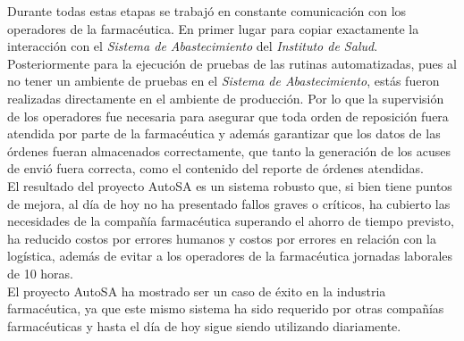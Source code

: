 Durante todas estas etapas se trabajó en constante comunicación con los operadores de la farmacéutica. En primer lugar para copiar exactamente la interacción con el \textit{Sistema de Abastecimiento} del \textit{Instituto de Salud}. Posteriormente para la ejecución de pruebas de las rutinas automatizadas, pues al no tener un ambiente de pruebas en el \textit{Sistema de Abastecimiento}, estás fueron realizadas directamente en el ambiente de producción. Por lo que la supervisión de los operadores fue necesaria para asegurar que toda orden de reposición fuera atendida por parte de la farmacéutica y además garantizar que los datos de las órdenes fueran almacenados correctamente, que tanto la generación de los acuses de envió fuera correcta, como el contenido del reporte de órdenes atendidas.\\
El resultado del proyecto AutoSA es un sistema robusto que, si bien tiene puntos de mejora, al día de hoy no ha presentado fallos graves o críticos, ha cubierto las necesidades de la compañía farmacéutica superando el ahorro de tiempo previsto, ha reducido costos por errores humanos y costos por errores en relación con la logística, además de evitar a los operadores de la farmacéutica jornadas laborales de 10 horas.\\
El proyecto AutoSA ha mostrado ser un caso de éxito en la industria farmacéutica, ya que este mismo sistema ha sido requerido por otras compañías farmacéuticas y hasta el día de hoy sigue siendo  utilizando diariamente.
